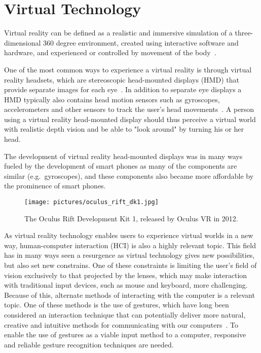 \section{Virtual Technology}
Virtual reality can be defined as a realistic and immersive simulation of a three-dimensional 360 degree environment, 
created using interactive software and hardware, and experienced or controlled by movement of the body~\citep{VRS2016}.

One of the most common ways to experience a virtual reality is through virtual reality headsets, which are stereoscopic head-mounted displays (HMD) 
that provide separate images for each eye~\citep{POLYGON2016}. 
In addition to separate eye displays a HMD typically also contains head motion sensors such as gyroscopes, accelerometers 
and other sensors to track the user's head movements~\citep{TW2016}. 
A person using a virtual reality head-mounted display should thus perceive a virtual world with realistic depth vision and be able to "look around" 
by turning his or her head.

The development of virtual reality head-mounted displays was in many ways fueled by the development of smart phones as many of the components are similar 
(e.g.~gyroscopes), and
these components also became more affordable by the prominence of smart phones. 

\begin{figure}%
	\texttt{[image: pictures/oculus\_rift\_dk1.jpg]}
	\caption[The Oculus Rift Development Kit 1]{The Oculus Rift Development Kit 1, released by Oculus VR in 2012.}
	\label{fig:oculus}
\end{figure}

As virtual reality technology enables users to experience virtual worlds in a new way, 
human-computer interaction (HCI) is also a highly relevant topic. 
This field has in many ways seen a resurgence as virtual technology gives new possibilities, but also set new constrains. 
One of these constraints is limiting the user's field of vision exclusively to that projected by the lenses, 
which may make interaction with traditional input devices, such as mouse and keyboard, more challenging. 
Because of this, alternate methods of interacting with the computer is a relevant topic. 
One of these methods is the use of gestures, 
which have long been considered an interaction technique that can potentially deliver more natural, 
creative and intuitive methods for communicating with our computers~\citep{Rautaray2015}. 
To enable the use of gestures as a viable input method to a computer, responsive and reliable gesture recognition techniques are needed.  

